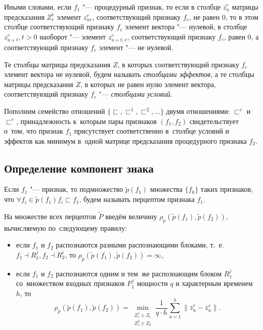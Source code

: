 Иными словами, если $f_1$ "--- процедурный признак, то если в столбце $\bar z_u^r$ матрицы предсказания $Z_r^1$ элемент $z_{uv}^r$, соответствующий признаку $f_c$, не равен $0$, то в этом столбце соответствующий признаку $f_e$ элемент вектора "--- нулевой, в столбце $z_{u+t}^r, t>0$ наоборот "--- элемент $z_{u+t,v}^r$, соответствующий признаку $f_c$, равен $0$, а соответствующий признаку $f_e$ элемент "--- не нулевой.

\begin{Def}
	Те столбцы матрицы предсказания $Z$, в которых соответствующий признаку $f_e$ элемент вектора не нулевой, будем называть \textit{столбцами эффектов}, а те столбцы матрицы предсказания $Z$, в которых не равен нулю элемент вектора, соответствующий признаку $f_c$ "--- \textit{столбцами условий}. 
\end{Def}

Пополним семейство отношений $\{\sqsubset,\sqsubset^1,\sqsubset^2,\dots\}$ двумя отношениями: $\sqsubset^c$ и $\sqsubset^e$, принадлежность к~которым пары признаков $(f_1,f_2)$ свидетельствует о~том, что признак $f_1$ присутствует соответственно в~столбце условий и эффектов как минимум в~одной матрице предсказания процедурного признака $f_2$.

\subsection{Определение компонент знака}

\begin{Def}
	Если $f_1$ "--- признак, то подмножество $\tilde p(f_1)$ множества $\{f_k\}$ таких признаков, что $\forall f_i\in\tilde p(f_1) f_i\sqsubset f_1$, будем называть перцептом признака $f_1$.
\end{Def}

На множестве всех перцептов $\tilde P$ введём величину $\rho_p(\tilde p(f_1),\tilde p(f_2))$, вычисляемую по~следующему правилу:
\begin{itemize}
	\item если $f_1$ и $f_2$ распознаются разными распознающими блоками, т.~е. $f_1\dashv R_1^j, f_2\dashv R_2^i$, то $\rho_p(\tilde p(f_1),\tilde p(f_2))=\infty$,
	\item если $f_1$ и $f_2$ распознаются одним и тем~же распознающим блоком $R_1^j$ со~множеством входных признаков $F_1^j$ мощности $q$ и характерным временем $h$, то
	\begin{equation}
		\rho_p(\tilde p(f_1),\tilde p(f_2))=\min\limits_{\substack{Z_r^1\in Z_1\\Z_s^2\in Z_2}}\frac{1}{q\cdot h}\sum\limits_{u=1}^h\|\bar z_u^r-\bar z_u^s\|.
	\end{equation} 
\end{itemize}

